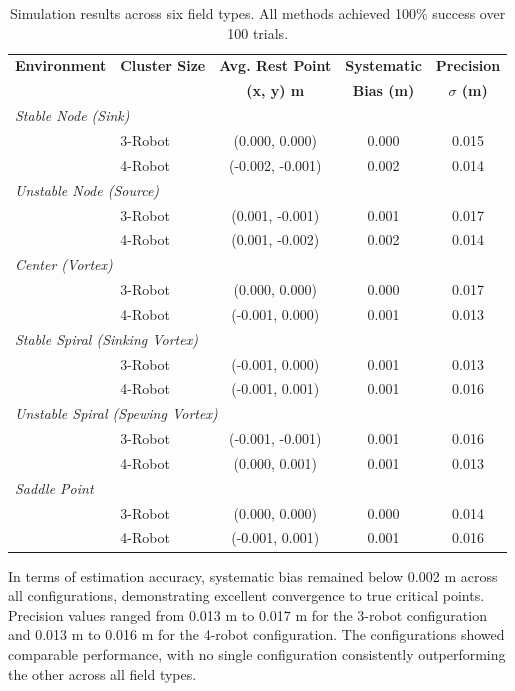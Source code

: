 \documentclass[lettersize,journal]{IEEEtran}
\begin{document}
\begin{table}[!t]
\footnotesize
\centering
\caption{Simulation results across six field types. All methods achieved 100\% success over 100 trials.}
\label{tab:simulation_estimation_results}
\setlength{\tabcolsep}{4pt}
\begin{tabular}{llccc}
\hline
\textbf{Environment} & \textbf{Cluster Size} & \textbf{Avg. Rest Point} & \textbf{Systematic} & \textbf{Precision} \\
 & & \textbf{(x, y) m} & \textbf{Bias (m)} & \textbf{$\sigma$ (m)} \\
\hline
\multicolumn{5}{l}{\textit{Stable Node (Sink)}} \\
\hline
 & 3-Robot & (0.000, 0.000) & 0.000 & 0.015 \\
 & 4-Robot & (-0.002, -0.001) & 0.002 & 0.014 \\
\hline
\multicolumn{5}{l}{\textit{Unstable Node (Source)}} \\
\hline
 & 3-Robot & (0.001, -0.001) & 0.001 & 0.017 \\
 & 4-Robot & (0.001, -0.002) & 0.002 & 0.014 \\
\hline
\multicolumn{5}{l}{\textit{Center (Vortex)}} \\
\hline
 & 3-Robot & (0.000, 0.000) & 0.000 & 0.017 \\
 & 4-Robot & (-0.001, 0.000) & 0.001 & 0.013 \\
\hline
\multicolumn{5}{l}{\textit{Stable Spiral (Sinking Vortex)}} \\
\hline
 & 3-Robot & (-0.001, 0.000) & 0.001 & 0.013 \\
 & 4-Robot & (-0.001, 0.001) & 0.001 & 0.016 \\
\hline
\multicolumn{5}{l}{\textit{Unstable Spiral (Spewing Vortex)}} \\
\hline
 & 3-Robot & (-0.001, -0.001) & 0.001 & 0.016 \\
 & 4-Robot & (0.000, 0.001) & 0.001 & 0.013 \\
\hline
\multicolumn{5}{l}{\textit{Saddle Point}} \\
\hline
 & 3-Robot & (0.000, 0.000) & 0.000 & 0.014 \\
 & 4-Robot & (-0.001, 0.001) & 0.001 & 0.016 \\
\hline
\end{tabular}
\end{table}


In terms of estimation accuracy, systematic bias remained below 0.002 m across all configurations, demonstrating excellent convergence to true critical points. Precision values ranged from 0.013 m to 0.017 m for the 3-robot configuration and 0.013 m to 0.016 m for the 4-robot configuration. The configurations showed comparable performance, with no single configuration consistently outperforming the other across all field types.
\end{document}
